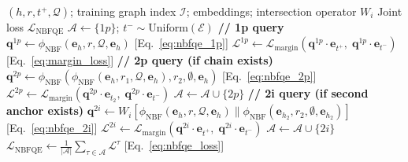 \documentclass[10pt,journal,compsoc]{IEEEtran}
\begin{document}
\begin{algorithm}[t]
\caption{NBFNet+StarQE: Forward Pass for One Triple}
\label{alg:nbfstarqe}
\begin{algorithmic}[1]
\Require $(h, r, t^+, \mathcal{Q})$;
  training graph index $\mathcal{I}$;
  embeddings; intersection operator $W_i$
\Ensure Joint loss $\mathcal{L}_{\mathrm{NBFQE}}$
\State $\mathcal{A} \leftarrow \{1p\}$;\;
  $t^- \sim \mathrm{Uniform}(\mathcal{E})$
\State \textbf{// 1p query}
\State $\mathbf{q}^{1p} \leftarrow
  \phi_{\mathrm{NBF}}(\mathbf{e}_h, r, \mathcal{Q},
  \mathbf{e}_h)$
  \hfill [Eq.~\ref{eq:nbfqe_1p}]
\State $\mathcal{L}^{1p} \leftarrow
  \mathcal{L}_{\mathrm{margin}}(
  \mathbf{q}^{1p}{\cdot}\mathbf{e}_{t^+},\;
  \mathbf{q}^{1p}{\cdot}\mathbf{e}_{t^-})$
  \hfill [Eq.~\ref{eq:margin_loss}]
\State \textbf{// 2p query (if chain exists)}
  \State $\mathbf{q}^{2p} \leftarrow
    \phi_{\mathrm{NBF}}(
    \phi_{\mathrm{NBF}}(\mathbf{e}_h, r_1,
    \mathcal{Q}, \mathbf{e}_h),
    r_2, \emptyset, \mathbf{e}_h)$
    \hfill [Eq.~\ref{eq:nbfqe_2p}]
  \State $\mathcal{L}^{2p} \leftarrow
    \mathcal{L}_{\mathrm{margin}}(
    \mathbf{q}^{2p}{\cdot}\mathbf{e}_{t_2},\;
    \mathbf{q}^{2p}{\cdot}\mathbf{e}_{t^-})$
  \State $\mathcal{A} \leftarrow
    \mathcal{A} \cup \{2p\}$
\EndIf
\State \textbf{// 2i query (if second anchor exists)}
  \State $\mathbf{q}^{2i} \leftarrow
    W_i[\phi_{\mathrm{NBF}}(\mathbf{e}_h,r,
    \mathcal{Q},\mathbf{e}_h)
    \|\phi_{\mathrm{NBF}}(\mathbf{e}_{h_2},r_2,
    \emptyset,\mathbf{e}_{h_2})]$
    \hfill [Eq.~\ref{eq:nbfqe_2i}]
  \State $\mathcal{L}^{2i} \leftarrow
    \mathcal{L}_{\mathrm{margin}}(
    \mathbf{q}^{2i}{\cdot}\mathbf{e}_{t^+},\;
    \mathbf{q}^{2i}{\cdot}\mathbf{e}_{t^-})$
  \State $\mathcal{A} \leftarrow
    \mathcal{A} \cup \{2i\}$
\EndIf
\State \Return
  $\mathcal{L}_{\mathrm{NBFQE}} \leftarrow
  \frac{1}{|\mathcal{A}|}
  \sum_{\tau \in \mathcal{A}} \mathcal{L}^{\tau}$
  \hfill [Eq.~\ref{eq:nbfqe_loss}]
\end{algorithmic}
\end{algorithm}
\end{document}
